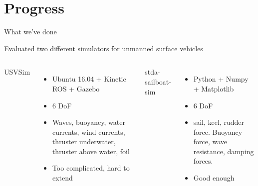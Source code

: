\documentclass[10pt,xcolor={table,dvipsnames},t]{beamer}
\begin{document}
\section{Progress}
\begin{frame}{What we've done}
    
    
        Evaluated two different simulators for unmanned surface vehicles
    \begin{columns}
        USVSim \cite{Paravisi2019}
        \begin{itemize}
            \item Ubuntu 16.04 + Kinetic ROS + Gazebo
            \item 6 DoF
            \item Waves, buoyancy, water currents, wind currents, thruster underwater, thruster above water, foil
            \item Too complicated, hard to extend
        \end{itemize}
        stda-sailboat-sim \cite{Buehler2018}
        \begin{itemize}
            \item Python + Numpy + Matplotlib
            \item 6 DoF
            \item sail, keel, rudder force. Buoyancy force, wave resistance, damping forces.
            \item Good enough
        \end{itemize}
    \end{columns}
\end{frame}
\end{document}
